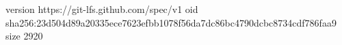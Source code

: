 version https://git-lfs.github.com/spec/v1
oid sha256:23d504d89a20335ece7623efbb1078f56da7dc86bc4790dcbc8734cdf786faa9
size 2920

